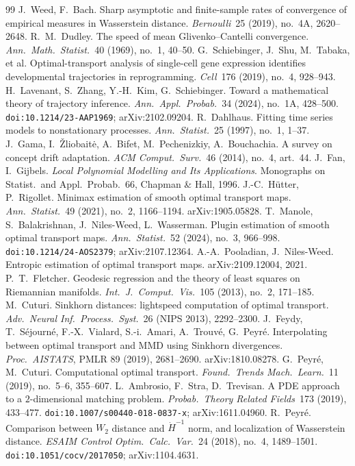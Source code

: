 \documentclass[11pt]{article}
\theoremstyle{definition}
\theoremstyle{remark}
\begin{document}
\begin{thebibliography}{99}
 J.~Weed, F.~Bach. Sharp asymptotic and finite-sample rates of convergence of empirical measures in Wasserstein distance. \emph{Bernoulli}\ 25 (2019), no.~4A, 2620--2648.
 R.~M.~Dudley. The speed of mean Glivenko--Cantelli convergence. \emph{Ann.\ Math.\ Statist.}\ 40 (1969), no.~1, 40--50.
 G.~Schiebinger, J.~Shu, M.~Tabaka, et al. Optimal-transport analysis of single-cell gene expression identifies developmental trajectories in reprogramming. \emph{Cell}\ 176 (2019), no.~4, 928--943.
 H.~Lavenant, S.~Zhang, Y.-H.~Kim, G.~Schiebinger. Toward a mathematical theory of trajectory inference. \emph{Ann.\ Appl.\ Probab.}\ 34 (2024), no.~1A, 428--500. \texttt{doi:10.1214/23-AAP1969}; arXiv:2102.09204.
 R.~Dahlhaus. Fitting time series models to nonstationary processes. \emph{Ann.\ Statist.}\ 25 (1997), no.~1, 1--37.
 J.~Gama, I.~\v{Z}liobait\.e, A.~Bifet, M.~Pechenizkiy, A.~Bouchachia. A survey on concept drift adaptation. \emph{ACM Comput.\ Surv.}\ 46 (2014), no.~4, art.~44.
 J.~Fan, I.~Gijbels. \emph{Local Polynomial Modelling and Its Applications}. Monographs on Statist.\ and Appl.\ Probab.\ 66, Chapman \& Hall, 1996.
 J.-C.~H\"utter, P.~Rigollet. Minimax estimation of smooth optimal transport maps. \emph{Ann.\ Statist.}\ 49 (2021), no.~2, 1166--1194. arXiv:1905.05828.
 T.~Manole, S.~Balakrishnan, J.~Niles-Weed, L.~Wasserman. Plugin estimation of smooth optimal transport maps. \emph{Ann.\ Statist.}\ 52 (2024), no.~3, 966--998. \texttt{doi:10.1214/24-AOS2379}; arXiv:2107.12364.
 A.-A.~Pooladian, J.~Niles-Weed. Entropic estimation of optimal transport maps. arXiv:2109.12004, 2021.
 P.~T.~Fletcher. Geodesic regression and the theory of least squares on Riemannian manifolds. \emph{Int.\ J.\ Comput.\ Vis.}\ 105 (2013), no.~2, 171--185.
 M.~Cuturi. Sinkhorn distances: lightspeed computation of optimal transport. \emph{Adv.\ Neural Inf.\ Process.\ Syst.}\ 26 (NIPS 2013), 2292--2300.
 J.~Feydy, T.~S\'ejourn\'e, F.-X.~Vialard, S.-i.~Amari, A.~Trouv\'e, G.~Peyr\'e. Interpolating between optimal transport and MMD using Sinkhorn divergences. \emph{Proc.\ AISTATS}, PMLR 89 (2019), 2681--2690. arXiv:1810.08278.
 G.~Peyr\'e, M.~Cuturi. Computational optimal transport. \emph{Found.\ Trends Mach.\ Learn.}\ 11 (2019), no.~5--6, 355--607.
 L.~Ambrosio, F.~Stra, D.~Trevisan. A PDE approach to a $2$-dimensional matching problem. \emph{Probab.\ Theory Related Fields}\ 173 (2019), 433--477. \texttt{doi:10.1007/s00440-018-0837-x}; arXiv:1611.04960.
 R.~Peyr\'e. Comparison between $W_2$ distance and $\dot H^{-1}$ norm, and localization of Wasserstein distance. \emph{ESAIM Control Optim.\ Calc.\ Var.}\ 24 (2018), no.~4, 1489--1501. \texttt{doi:10.1051/cocv/2017050}; arXiv:1104.4631.
\end{thebibliography}
\end{document}
